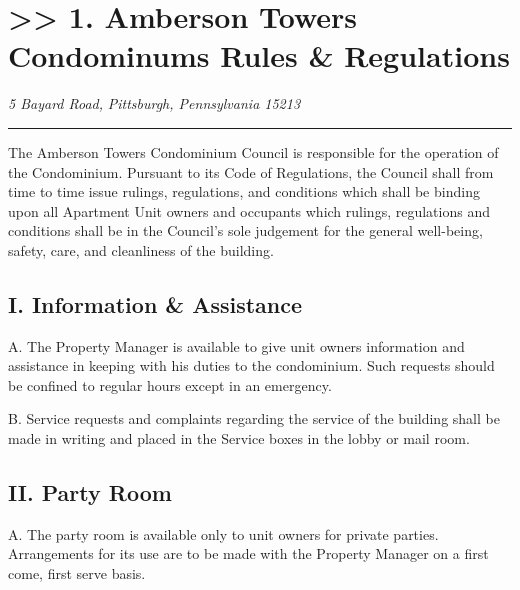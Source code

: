 \documentclass[
]{book}
\begin{document}
\hypertarget{amberson-towers-condominums-rules-regulations}{%
\chapter*{\texorpdfstring{\textgreater\textgreater{} 1. Amberson Towers Condominums Rules \& Regulations}{\textgreater\textgreater{} 1. Amberson Towers Condominums   Rules \& Regulations}}\label{amberson-towers-condominums-rules-regulations}}

\emph{5 Bayard Road, }
\emph{Pittsburgh, Pennsylvania 15213}

\begin{center}\rule{0.5\linewidth}{0.5pt}\end{center}

The Amberson Towers Condominium Council is responsible for the operation of the Condominium. Pursuant to its Code of Regulations, the Council shall from time to time issue rulings, regulations, and conditions which shall be binding upon all Apartment Unit owners and occupants which rulings, regulations and conditions shall be in the Council's sole judgement for the general well-being, safety, care, and cleanliness of the building.

\hypertarget{i.-information-assistance}{%
\section*{I. Information \& Assistance}\label{i.-information-assistance}}

A. The Property Manager is available to give unit owners information and assistance in keeping with his duties to the condominium. Such requests should be confined to regular hours except in an emergency.

B. Service requests and complaints regarding the service of the building shall be made in writing and placed in the Service boxes in the lobby or mail room.

\hypertarget{ii.-party-room}{%
\section*{II. Party Room}\label{ii.-party-room}}

A. The party room is available only to unit owners for private parties. Arrangements for its use are to be made with the Property Manager on a first come, first serve basis.
\end{document}
